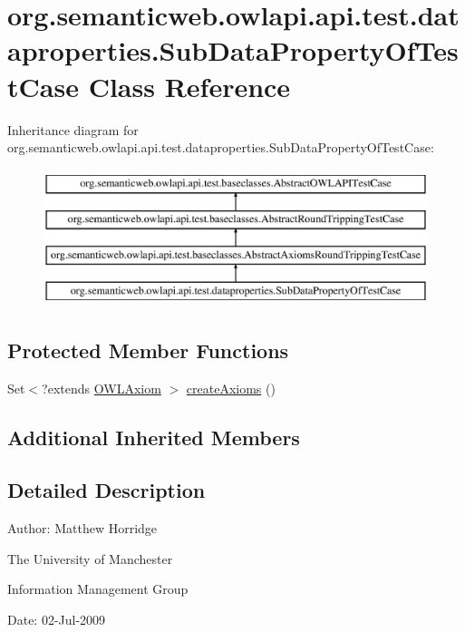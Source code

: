 \hypertarget{classorg_1_1semanticweb_1_1owlapi_1_1api_1_1test_1_1dataproperties_1_1_sub_data_property_of_test_case}{\section{org.\-semanticweb.\-owlapi.\-api.\-test.\-dataproperties.\-Sub\-Data\-Property\-Of\-Test\-Case Class Reference}
\label{classorg_1_1semanticweb_1_1owlapi_1_1api_1_1test_1_1dataproperties_1_1_sub_data_property_of_test_case}
}
Inheritance diagram for org.\-semanticweb.\-owlapi.\-api.\-test.\-dataproperties.\-Sub\-Data\-Property\-Of\-Test\-Case\-:\begin{figure}[H]
\begin{center}
\leavevmode
\includegraphics[height=4.000000cm]{classorg_1_1semanticweb_1_1owlapi_1_1api_1_1test_1_1dataproperties_1_1_sub_data_property_of_test_case}
\end{center}
\end{figure}
\subsection*{Protected Member Functions}
\begin{DoxyCompactItemize}
\item 
Set$<$?extends \hyperlink{interfaceorg_1_1semanticweb_1_1owlapi_1_1model_1_1_o_w_l_axiom}{O\-W\-L\-Axiom} $>$ \hyperlink{classorg_1_1semanticweb_1_1owlapi_1_1api_1_1test_1_1dataproperties_1_1_sub_data_property_of_test_case_a11af4b8ca6eb89052dba75020b82476e}{create\-Axioms} ()
\end{DoxyCompactItemize}
\subsection*{Additional Inherited Members}


\subsection{Detailed Description}
Author\-: Matthew Horridge\par
 The University of Manchester\par
 Information Management Group\par
 Date\-: 02-\/\-Jul-\/2009 

